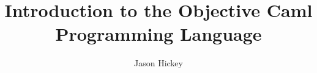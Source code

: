 \documentclass{book}
\title{Introduction to the Objective Caml Programming Language}
\author{Jason Hickey}
\begin{document}
\maketitle
\tableofcontents

\sloppy






\printindex
\end{document}
